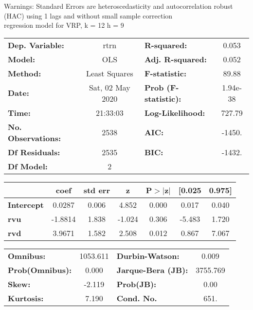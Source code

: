 Warnings: \newline
 [1] Standard Errors are heteroscedasticity and autocorrelation robust (HAC) using 1 lags and without small sample correction\\ 

regression model for VRP, k = 12 h = 9\begin{center}
\begin{tabular}{lclc}
\toprule
\textbf{Dep. Variable:}    &       rtrn       & \textbf{  R-squared:         } &     0.053   \\
\textbf{Model:}            &       OLS        & \textbf{  Adj. R-squared:    } &     0.052   \\
\textbf{Method:}           &  Least Squares   & \textbf{  F-statistic:       } &     89.88   \\
\textbf{Date:}             & Sat, 02 May 2020 & \textbf{  Prob (F-statistic):} &  1.94e-38   \\
\textbf{Time:}             &     21:33:03     & \textbf{  Log-Likelihood:    } &    727.79   \\
\textbf{No. Observations:} &        2538      & \textbf{  AIC:               } &    -1450.   \\
\textbf{Df Residuals:}     &        2535      & \textbf{  BIC:               } &    -1432.   \\
\textbf{Df Model:}         &           2      & \textbf{                     } &             \\
\bottomrule
\end{tabular}
\begin{tabular}{lcccccc}
                   & \textbf{coef} & \textbf{std err} & \textbf{z} & \textbf{P$> |$z$|$} & \textbf{[0.025} & \textbf{0.975]}  \\
\midrule
\textbf{Intercept} &       0.0287  &        0.006     &     4.852  &         0.000        &        0.017    &        0.040     \\
\textbf{rvu}       &      -1.8814  &        1.838     &    -1.024  &         0.306        &       -5.483    &        1.720     \\
\textbf{rvd}       &       3.9671  &        1.582     &     2.508  &         0.012        &        0.867    &        7.067     \\
\bottomrule
\end{tabular}
\begin{tabular}{lclc}
\textbf{Omnibus:}       & 1053.611 & \textbf{  Durbin-Watson:     } &    0.009  \\
\textbf{Prob(Omnibus):} &   0.000  & \textbf{  Jarque-Bera (JB):  } & 3755.769  \\
\textbf{Skew:}          &  -2.119  & \textbf{  Prob(JB):          } &     0.00  \\
\textbf{Kurtosis:}      &   7.190  & \textbf{  Cond. No.          } &     651.  \\
\bottomrule
\end{tabular}
\end{center}

